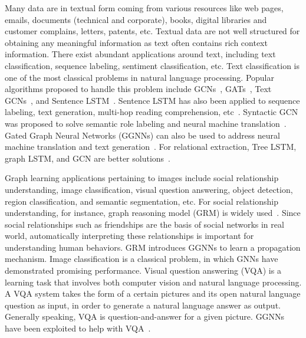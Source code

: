Many data are in textual form coming from various resources like web pages, emails, documents (technical and corporate), books, digital libraries and customer complains, letters, patents, etc. Textual data are not well structured for obtaining any meaningful information as text often contains rich context information. There exist abundant applications around text, including text classification, sequence labeling, sentiment classification, etc. Text classification is one of the most classical problems in natural language processing. Popular algorithms proposed to handle this problem include GCNs~, GATs~, Text GCNs~, and Sentence LSTM~. Sentence LSTM has also been applied to sequence labeling, text generation, multi-hop reading comprehension, etc~. Syntactic GCN was proposed to solve semantic role labeling and neural machine translation~. Gated Graph Neural Networks (GGNNs) can also be used to address neural machine translation and text generation~. For relational extraction, Tree LSTM, graph LSTM, and GCN are better solutions~.

Graph learning applications pertaining to images include social relationship understanding, image classification, visual question answering, object detection, region classification, and semantic segmentation, etc. For social relationship understanding, for instance, graph reasoning model (GRM) is widely used~. Since social relationships such as friendships are the basis of social networks in real world, automatically interpreting these relationships is important for understanding human behaviors. GRM introduces GGNNs to learn a propagation mechanism. Image classification is a classical problem, in which GNNs have demonstrated promising performance. Visual question answering (VQA) is a learning task that involves both computer vision and natural language processing. A VQA system takes the form of a certain pictures and its open natural language question as input, in order to generate a natural language answer as output. Generally speaking, VQA is question-and-answer for a given picture. GGNNs have been exploited to help with VQA~.

